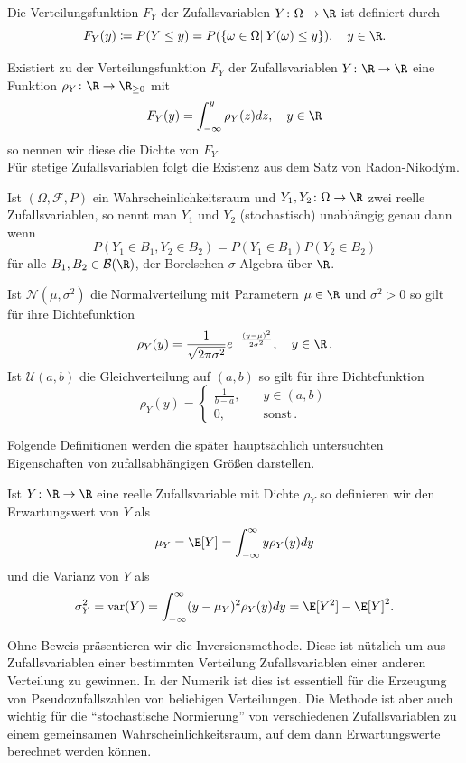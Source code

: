 \begin{mathdef}[Verteilungsfunktion]
Die Verteilungsfunktion $F_Y$ der Zufallsvariablen $Y\colon\Omega\to\R$ ist definiert durch
\[F_Y(y)\coloneqq P(Y\le y)=P(\left\lbrace \omega\in\Omega |\: Y(\omega)\le y\right\rbrace),\quad y\in\R.\]
\end{mathdef}
\begin{mathdef}
Existiert zu der Verteilungsfunktion $F_Y$ der Zufallsvariablen $Y\colon\R\to\R$ eine Funktion $\rho_Y\colon\R\to\R_{\ge 0}$ mit
\[F_Y(y)=\int_{-\infty}^y\rho_Y(z)dz,\quad y\in\R\]
so nennen wir diese die Dichte von $F_Y$.\\
Für stetige Zufallsvariablen folgt die Existenz aus dem Satz von Radon-Nikodým.
\end{mathdef}
\begin{mathdef}
Ist $(\Omega,\mathcal{F},P)$ ein Wahrscheinlichkeitsraum und $Y_1, Y_2\colon \Omega\to\R$ zwei reelle Zufallsvariablen, so nennt man $Y_1$ und $Y_2$ (stochastisch) unabhängig genau dann wenn
\[P(Y_1\in B_1,Y_2\in B_2)=P(Y_1\in B_1)P(Y_2\in B_2)\]
für alle $B_1,B_2\in \mathcal{B}(\R)$, der Borelschen $\sigma$-Algebra über $\R$.
\end{mathdef}
\begin{mathbsp}
Ist $\mathcal{N}(\mu, \sigma^2)$ die Normalverteilung mit Parametern $\mu\in\R$ und $\sigma^2>0$ so gilt für ihre Dichtefunktion
\[\rho_Y(y)=\frac{1}{\sqrt{2\pi\sigma^2}}e^{-\frac{(y-\mu)^2}{2\sigma^2}},\quad y\in\R\,.\]
Ist $\mathcal{U}(a,b)$ die Gleichverteilung auf $(a,b)$ so gilt für ihre Dichtefunktion
\[\rho_Y(y)=\begin{cases}\frac{1}{b-a},\quad &y\in (a,b)\\ 0, \quad &\text{sonst}\,. \end{cases}\]
\end{mathbsp}
Folgende Definitionen werden die später hauptsächlich untersuchten Eigenschaften von zufallsabhängigen Größen darstellen.
\begin{mathdef}
Ist $Y\colon\R\to\R$ eine reelle Zufallsvariable mit Dichte $\rho_Y$ so definieren wir den Erwartungswert von $Y$ als
\[\mu_Y=\E[Y]=\int_{-\infty}^\infty y\rho_Y(y)dy\]
und die Varianz von $Y$ als 
\[\sigma_Y^2=\text{var}(Y)=\int_{-\infty}^\infty (y-\mu_Y)^2\rho_Y(y)dy=\E[Y^2]-\E[Y]^2.\]
\end{mathdef}
Ohne Beweis präsentieren wir die Inversionsmethode. Diese ist nützlich um aus Zufallsvariablen einer bestimmten Verteilung Zufallsvariablen einer anderen Verteilung zu gewinnen. In der Numerik ist dies ist essentiell für die Erzeugung von Pseudozufallszahlen von beliebigen Verteilungen. Die Methode ist aber auch wichtig für die "`stochastische Normierung"' von verschiedenen Zufallsvariablen zu einem gemeinsamen Wahrscheinlichkeitsraum, auf dem dann Erwartungswerte berechnet werden können.

